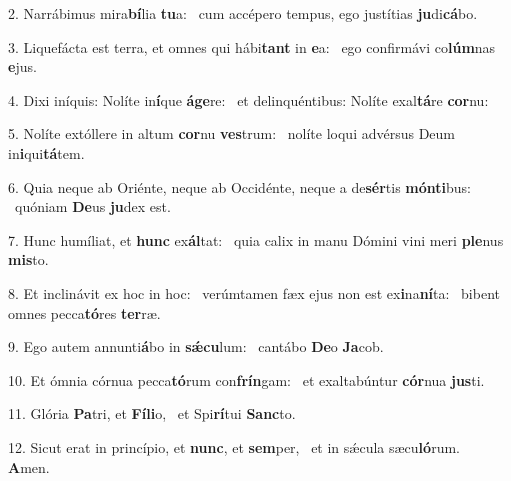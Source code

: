 2. Narrábimus mira\textbf{bí}lia \textbf{tu}a: \ast\  cum accépero tempus, ego justítias \textbf{ju}di\textbf{cá}bo.\

3. Liquefácta est terra, et omnes qui hábi\textbf{tant} in \textbf{e}a: \ast\  ego confirmávi co\textbf{lúm}nas \textbf{e}jus.\

4. Dixi iníquis: Nolíte in\textbf{í}que \textbf{á}\textbf{ge}re: \ast\  et delinquéntibus: Nolíte exal\textbf{tá}re \textbf{cor}nu:\

5. Nolíte extóllere in altum \textbf{cor}nu \textbf{ves}trum: \ast\  nolíte loqui advérsus Deum in\textbf{i}qui\textbf{tá}tem.\

6. Quia neque ab Oriénte, neque ab Occidénte, neque a de\textbf{sér}tis \textbf{món}\textbf{ti}bus: \ast\  quóniam \textbf{De}us \textbf{ju}dex est.\

7. Hunc humíliat, et \textbf{hunc} ex\textbf{ál}tat: \ast\  quia calix in manu Dómini vini meri \textbf{ple}nus \textbf{mis}to.\

8. Et inclinávit ex hoc in hoc: \dag\  verúmtamen fæx ejus non est ex\textbf{i}na\textbf{ní}ta: \ast\  bibent omnes pecca\textbf{tó}res \textbf{ter}ræ.\

9. Ego autem annunti\textbf{á}bo in \textbf{sǽ}\textbf{cu}lum: \ast\  cantábo \textbf{De}o \textbf{Ja}cob.\

10. Et ómnia córnua pecca\textbf{tó}rum con\textbf{frín}gam: \ast\  et exaltabúntur \textbf{cór}nua \textbf{jus}ti.\

11. Glória \textbf{Pa}tri, et \textbf{Fí}\textbf{li}o, \ast\  et Spi\textbf{rí}tui \textbf{Sanc}to.\

12. Sicut erat in princípio, et \textbf{nunc}, et \textbf{sem}per, \ast\  et in sǽcula sæcu\textbf{ló}rum. \textbf{A}men.\

